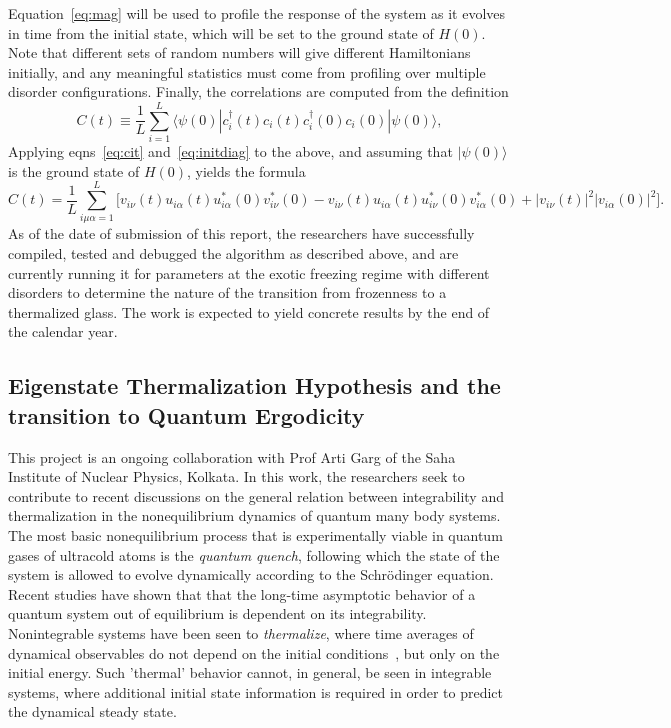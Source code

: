 \documentclass[a4paper,10pt]{report}
\begin{document}
Equation~\ref{eq:mag} will be used to profile the response of the system as it evolves in time from the initial state, which will be set to the ground state of $H(0)$. Note that different sets of random numbers will give different Hamiltonians initially, and any meaningful statistics must come from profiling over multiple disorder configurations.
Finally, the correlations are computed from the definition
\begin{equation}
\label{eq:corrdef}
C(t) \equiv \frac{1}{L}\sum^L_{i=1} \langle \psi(0) | c^\dagger_i (t) c_i(t) c^\dagger_i (0) c_i(0) |\psi(0)\rangle,
\end{equation}
Applying eqns~\ref{eq:cit} and~\ref{eq:initdiag} to the above, and assuming that $ |\psi(0)\rangle$ is the ground state of $H(0)$, 
yields the formula
\begin{equation}
\label{eq:corr}
C(t) = \frac{1}{L}\sum^L_{i\mu\alpha=1} \bigg[v_{i\nu}(t)u_{i\alpha}(t)u^\ast_{i\alpha}(0)v^\ast_{i\nu}(0)-
  v_{i\nu}(t)u_{i\alpha}(t)u^\ast_{i\nu}(0)v^\ast_{i\alpha}(0)+|v_{i\nu}(t)|^2|v_{i\alpha}(0)|^2\bigg].
\end{equation}
As of the date of submission of this report, the researchers have successfully compiled, tested and debugged the algorithm as described above, and are currently running it for parameters at the exotic freezing regime with different disorders to determine the nature of the transition from frozenness to a thermalized glass. The work is expected to yield concrete results by the end of the calendar year. 

\subsection{Eigenstate Thermalization Hypothesis and the transition to Quantum Ergodicity}
This project is an ongoing collaboration with Prof Arti Garg of the Saha Institute of Nuclear Physics, Kolkata. In this work, the researchers seek to contribute to recent discussions on the general relation between integrability and thermalization in the nonequilibrium dynamics of quantum many body systems. The most basic nonequilibrium process that is experimentally viable in quantum gases of ultracold atoms is the \textit{quantum quench}, following which the state of the system is allowed to evolve dynamically according to the Schr\"odinger equation. Recent studies have shown that that the long-time asymptotic behavior of a quantum system out of equilibrium is dependent on its integrability. Nonintegrable systems have been seen to \textit{thermalize}, where time averages of dynamical observables do not depend on the initial conditions~\cite{rigol:nature:etc}, but only on the initial energy. Such 'thermal' behavior cannot, in general, be seen in integrable systems, where additional initial state information is required in order to predict the dynamical steady state.
\end{document}
